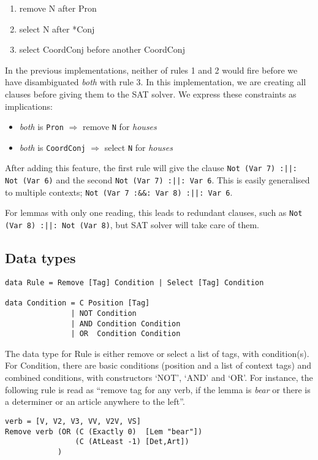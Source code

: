 \documentclass[a4paper, 11pt]{article}
\begin{document}
\begin{enumerate}
\item remove N after Pron
\item select N after *Conj
\item select CoordConj before another CoordConj
\end{enumerate}

In the previous implementations, neither of rules 1 and 2 would fire
before we have disambiguated \emph{both} with rule 3.
In this implementation, we are creating all clauses before giving
them to the SAT solver. We express these constraints as implications:
\begin{itemize}
\item \emph{both} is \texttt{Pron} $\Rightarrow$ remove \texttt{N} for \emph{houses}
\item \emph{both} is \texttt{CoordConj} $\Rightarrow$ select
  \texttt{N} for \emph{houses}
\end{itemize}

After adding this feature, the first rule will give the clause
\texttt{Not (Var 7) :||: Not (Var 6)} and the second \texttt{Not (Var
  7) :||: Var 6}.
This is easily generalised to multiple contexts; \texttt{Not (Var
  7 :&&: Var 8) :||: Var 6}.

For lemmas with only one reading, this leads to redundant clauses,
such as \texttt{Not (Var 8) :||: Not (Var 8)}, but SAT solver will
take care of them.

\subsection{Data types}

\begin{lstlisting}
data Rule = Remove [Tag] Condition | Select [Tag] Condition

data Condition = C Position [Tag]
               | NOT Condition
               | AND Condition Condition
               | OR  Condition Condition 
\end{lstlisting}

The data type for Rule is either remove or select a list of tags, with condition(s).
For Condition, there are basic conditions (position and a list of context tags) and combined conditions, with constructors `NOT', `AND' and `OR'. For instance, the following rule is read as ``remove tag for any verb, if the lemma is \emph{bear} or there is a determiner or an article anywhere to the left''.

\begin{lstlisting}
verb = [V, V2, V3, VV, V2V, VS]
Remove verb (OR (C (Exactly 0)  [Lem "bear"])
                (C (AtLeast -1) [Det,Art])
            )
\end{lstlisting}
\end{document}
